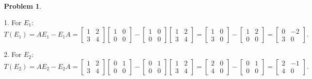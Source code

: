\documentclass[12pt]{article}
\theoremstyle{definition}
\newtheorem{problem}{Problem}
\begin{document}
\begin{problem}
\begin{solution}
        1. For \( E_1 \):
        \[
        T(E_1) = A E_1 - E_1 A = \begin{bmatrix} 1 & 2 \\ 3 & 4 \end{bmatrix} \begin{bmatrix} 1 & 0 \\ 0 & 0 \end{bmatrix} - \begin{bmatrix} 1 & 0 \\ 0 & 0 \end{bmatrix} \begin{bmatrix} 1 & 2 \\ 3 & 4 \end{bmatrix} = \begin{bmatrix} 1 & 0 \\ 3 & 0 \end{bmatrix} - \begin{bmatrix} 1 & 2 \\ 0 & 0 \end{bmatrix} = \begin{bmatrix} 0 & -2 \\ 3 & 0 \end{bmatrix}.
        \]

        2. For \( E_2 \):
        \[
        T(E_2) = A E_2 - E_2 A = \begin{bmatrix} 1 & 2 \\ 3 & 4 \end{bmatrix} \begin{bmatrix} 0 & 1 \\ 0 & 0 \end{bmatrix} - \begin{bmatrix} 0 & 1 \\ 0 & 0 \end{bmatrix} \begin{bmatrix} 1 & 2 \\ 3 & 4 \end{bmatrix} = \begin{bmatrix} 2 & 0 \\ 4 & 0 \end{bmatrix} - \begin{bmatrix} 0 & 1 \\ 0 & 0 \end{bmatrix} = \begin{bmatrix} 2 & -1 \\ 4 & 0 \end{bmatrix}.
        \]


\end{solution}
\end{problem}
\end{document}
